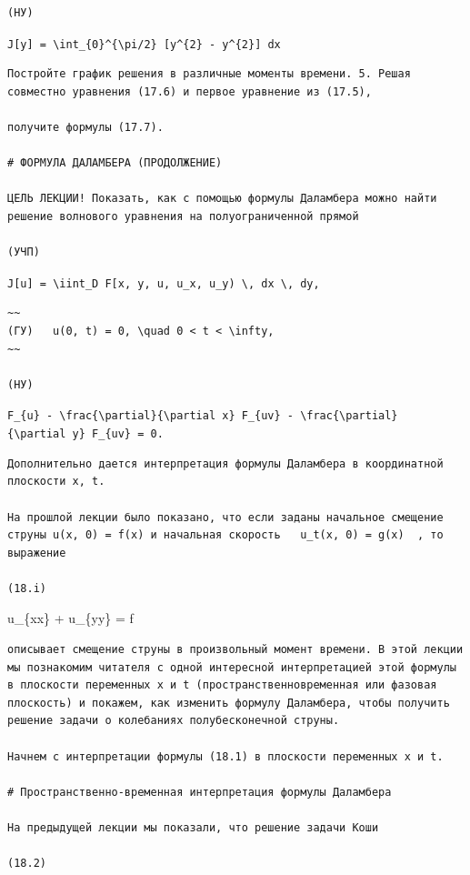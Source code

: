 \documentclass[
  ukrainian,
]{article}
\begin{document}
\begin{verbatim}
(НУ)
\end{verbatim}

\texttt{J{[}y{]}\ =\ \textbackslash{}int\_\{0\}\^{}\{\textbackslash{}pi/2\}\ {[}y\textquotesingle{}\^{}\{2\}\ -\ y\^{}\{2\}{]}\ dx}

\begin{verbatim}
Постройте график решения в различные моменты времени. 5. Решая совместно уравнения (17.6) и первое уравнение из (17.5),

получите формулы (17.7).

# ФОРМУЛА ДАЛАМБЕРА (ПРОДОЛЖЕНИЕ)

ЦЕЛЬ ЛЕКЦИИ! Показать, как с помощью формулы Даламбера можно найти решение волнового уравнения на полуограниченной прямой

(УЧП)
\end{verbatim}

\texttt{J{[}u{]}\ =\ \textbackslash{}iint\_D\ F{[}x,\ y,\ u,\ u\_x,\ u\_y)\ \textbackslash{},\ dx\ \textbackslash{},\ dy,}

\begin{verbatim}
~~
(ГУ)   u(0, t) = 0, \quad 0 < t < \infty,
~~

(НУ)
\end{verbatim}

\texttt{F\_\{u\}\ -\ \textbackslash{}frac\{\textbackslash{}partial\}\{\textbackslash{}partial\ x\}\ F\_\{uv\}\ -\ \textbackslash{}frac\{\textbackslash{}partial\}\{\textbackslash{}partial\ y\}\ F\_\{uv\}\ =\ 0.}

\begin{verbatim}
Дополнительно дается интерпретация формулы Даламбера в координатной плоскости x, t.

На прошлой лекции было показано, что если заданы начальное смещение струны u(x, 0) = f(x) и начальная скорость   u_t(x, 0) = g(x)  , то выражение

(18.i)
\end{verbatim}

u\_\{xx\} + u\_\{yy\} = f

\begin{verbatim}
описывает смещение струны в произвольный момент времени. В этой лекции мы познакомим читателя с одной интересной интерпретацией этой формулы в плоскости переменных x и t (пространственновременная или фазовая плоскость) и покажем, как изменить формулу Даламбера, чтобы получить решение задачи о колебаниях полубесконечной струны.

Начнем с интерпретации формулы (18.1) в плоскости переменных x и t.

# Пространственно-временная интерпретация формулы Даламбера

На предыдущей лекции мы показали, что решение задачи Коши

(18.2)
\end{verbatim}
\end{document}
